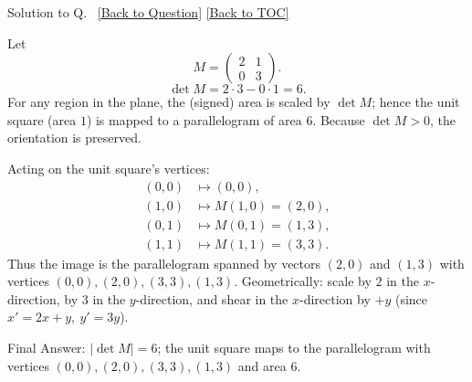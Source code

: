 \documentclass[11pt]{article}
\def\textbf#1{#1}%
\newcounter{question}
\newcounter{solutionNo} %
\newenvironment{solution}{
  \refstepcounter{solutionNo}%
  \hypertarget{sol-\thesolutionNo}{}%
  \par\noindent\textbf{Solution to Q\thesolutionNo.}~%
  \hyperlink{q-\thesolutionNo}{\small[Back to Question]}%
  \quad\hyperlink{toc}{\small[Back to TOC]}%
  \par\vspace{0.3em}%
}{\par}
\begin{document}
\begin{solution}
Let 
\[
M=\begin{pmatrix}2&1\\[2pt]0&3\end{pmatrix}.
\]
\[
\det M = 2\cdot 3 - 0\cdot 1 = \boxed{6}.
\]
For any region in the plane, the (signed) area is scaled by \(\det M\); hence the unit square
(area \(1\)) is mapped to a parallelogram of area \(\boxed{6}\).  Because \(\det M>0\), the
orientation is preserved.

Acting on the unit square’s vertices:
\[
\begin{aligned}
(0,0) &\mapsto (0,0),\\
(1,0) &\mapsto M(1,0)=(2,0),\\
(0,1) &\mapsto M(0,1)=(1,3),\\
(1,1) &\mapsto M(1,1)=(3,3).
\end{aligned}
\]
Thus the image is the parallelogram spanned by vectors \((2,0)\) and \((1,3)\) with vertices
\((0,0),(2,0),(3,3),(1,3)\).  Geometrically: scale by \(2\) in the \(x\)-direction, by \(3\) in the
\(y\)-direction, and shear in the \(x\)-direction by \(+y\) (since \(x' = 2x + y,\ y'=3y\)).

\begin{center}
\end{center}

\textbf{Final Answer:} \(|\det M|=6\); the unit square maps to the parallelogram with vertices
\((0,0),(2,0),(3,3),(1,3)\) and area \(6\).
\end{solution}
\end{document}
